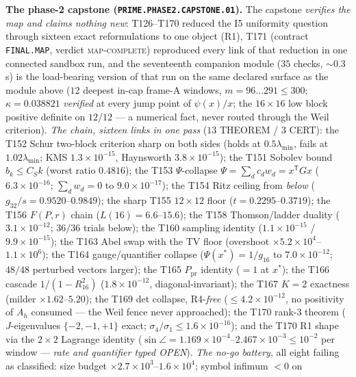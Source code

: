 \par\smallskip\noindent\textbf{The phase-2 capstone
(\texttt{PRIME.PHASE2.CAPSTONE.01}).}
The capstone \emph{verifies the map and claims nothing new}: T126--T170
reduced the I5 uniformity question through sixteen exact reformulations
to one object (R1), T171 (contract \texttt{FINAL.MAP}, verdict
\textsc{map-complete}) reproduced every link of that reduction in one
connected sandbox run, and the seventeenth companion module ($35$
checks, ${\sim}0.3$\,s) is the load-bearing version of that run on the
same declared surface as the module above ($12$ deepest in-cap frame-A
windows, $m=96\ldots291\le300$; $\kappa=0.038821$ \emph{verified} at
every jump point of $\psi(x)/x$; the $16\times16$ low block positive
definite on $12/12$ --- a numerical fact, never routed through the Weil
criterion).
\emph{The chain, sixteen links in one pass} ($13$ THEOREM / $3$ CERT):
the T152 Schur two-block criterion sharp on both sides (holds at
$0.5\lambda_{\min}$, fails at $1.02\lambda_{\min}$; KMS
$1.3\times10^{-15}$, Haynsworth $3.8\times10^{-15}$); the T151 Sobolev
bound $b_k\le C_Sk$ (worst ratio $0.4816$); the T153 $\Psi$-collapse
$\Psi=\sum_dc_dw_d=x^{\mathsf T}Gx$ ($6.3\times10^{-16}$; $\sum_dw_d=0$
to $9.0\times10^{-17}$); the T154 Ritz ceiling from \emph{below}
($g_{32}/s=0.9520$--$0.9849$); the sharp T155 $12\times12$ floor
($t=0.2295$--$0.3719$); the T156 $F(P,r)$ chain ($L(16)=6.6$--$15.6$);
the T158 Thomson/ladder duality ($3.1\times10^{-12}$; $36/36$ trials
below); the T160 sampling identity ($1.1\times10^{-15}$ /
$9.9\times10^{-15}$); the T163 Abel swap with the TV floor (overshoot
$\times5.2\times10^{4}$--$1.1\times10^{6}$); the T164 gauge/quantifier
collapse ($\Psi(x^*)=1/g_{16}$ to $7.0\times10^{-12}$; $48/48$
perturbed vectors larger); the T165 $P_{\mathrm{pr}}$ identity
($=1$ at $x^*$); the T166 cascade $1/(1-R_{16}^2)$
($1.8\times10^{-12}$, diagonal-invariant); the T167 $K=2$ exactness
(milder $\times1.62$--$5.20$); the T169 det collapse, R4-\emph{free}
($\le4.2\times10^{-12}$, no positivity of $A_h$ consumed --- the Weil
fence never approached); the T170 rank-3 theorem ($J$-eigenvalues
$\{-2,-1,+1\}$ exact; $\sigma_4/\sigma_1\le1.6\times10^{-16}$); and the
T170 R1 shape via the $2\times2$ Lagrange identity ($\sin\angle=
1.169\times10^{-4}$--$2.467\times10^{-3}\le10^{-2}$ per window ---
\emph{rate and quantifier typed OPEN}).
\emph{The no-go battery}, all eight failing as classified: size budget
$\times2.7\times10^{3}$--$1.6\times10^{4}$; symbol infimum $<0$ on
